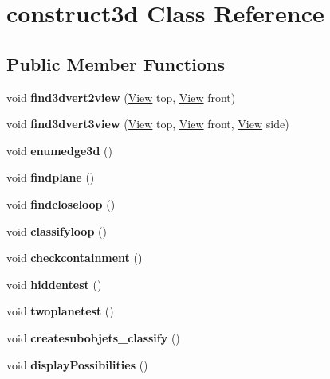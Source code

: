 \hypertarget{classconstruct3d}{}\section{construct3d Class Reference}
\label{classconstruct3d}
\subsection*{Public Member Functions}
\begin{DoxyCompactItemize}
\item 
\mbox{\label{classconstruct3d_a0d27a8762fc9c307e61adbef3ebebafa}} 
void {\bfseries find3dvert2view} (\mbox{\hyperlink{class_view}{View}} top, \mbox{\hyperlink{class_view}{View}} front)
\item 
\mbox{\label{classconstruct3d_a4d804340cfd01440a046c65db7bba96e}} 
void {\bfseries find3dvert3view} (\mbox{\hyperlink{class_view}{View}} top, \mbox{\hyperlink{class_view}{View}} front, \mbox{\hyperlink{class_view}{View}} side)
\item 
\mbox{\label{classconstruct3d_ac0154773fcab1a293fdb6c5375413459}} 
void {\bfseries enumedge3d} ()
\item 
\mbox{\label{classconstruct3d_a09d68b67d059e14beaad98e97743544e}} 
void {\bfseries findplane} ()
\item 
\mbox{\label{classconstruct3d_a5675ed9481f73f3534f335e3710fb9ab}} 
void {\bfseries findcloseloop} ()
\item 
\mbox{\label{classconstruct3d_aa12f2bae9452964c0d4d2a958f6aa028}} 
void {\bfseries classifyloop} ()
\item 
\mbox{\label{classconstruct3d_a2511c3231e5fed4d7ed8475ec0596d6a}} 
void {\bfseries checkcontainment} ()
\item 
\mbox{\label{classconstruct3d_a530103a3dc4d1803d7e740c19c5c1d9f}} 
void {\bfseries hiddentest} ()
\item 
\mbox{\label{classconstruct3d_a59e4fc1e10f0b6f72f3a8b73e2eb773e}} 
void {\bfseries twoplanetest} ()
\item 
\mbox{\label{classconstruct3d_a05f64a19c65dd287381fb7858cf4295a}} 
void {\bfseries createsubobjets\+\_\+classify} ()
\item 
\mbox{\label{classconstruct3d_ad88fc991cce0a811713c352cf5637d04}} 
void {\bfseries display\+Possibilities} ()
\end{DoxyCompactItemize}
